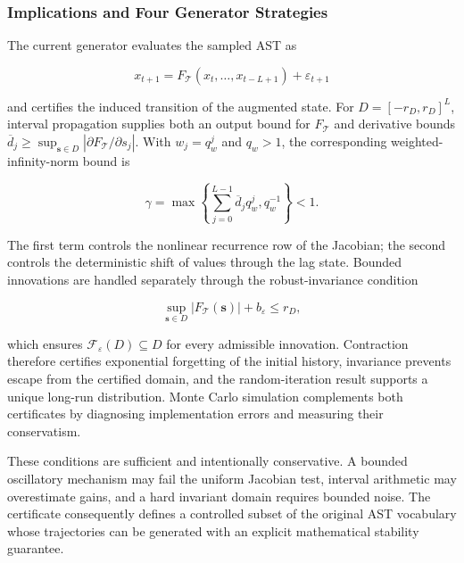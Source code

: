 \subsubsection{Implications and Four Generator Strategies}
\label{sec:four-generator-strategies}

The current generator evaluates the sampled AST as

\begin{equation}
    x_{t+1}
    =F_{\mathcal T}(x_t,\ldots,x_{t-L+1})+\varepsilon_{t+1}
\end{equation}

and certifies the induced transition of the augmented state. For
$D=[-r_D,r_D]^L$, interval propagation supplies both an output bound for
$F_{\mathcal T}$ and derivative bounds
$\overline d_j\ge
\sup_{\mathbf{s}\in D}|\partial F_{\mathcal T}/\partial s_j|$. With
$w_j=q_w^j$ and $q_w>1$, the corresponding weighted-infinity-norm bound is

\begin{equation}
    \gamma
    =\max\!\left\{
      \sum_{j=0}^{L-1}\overline d_j q_w^j,
      q_w^{-1}
    \right\}<1.
\end{equation}

The first term controls the nonlinear recurrence row of the Jacobian; the
second controls the deterministic shift of values through the lag state.
Bounded innovations are handled separately through the robust-invariance
condition

\begin{equation}
    \sup_{\mathbf{s}\in D}|F_{\mathcal T}(\mathbf{s})|
    +b_{\varepsilon}
    \le r_D,
\end{equation}

which ensures $\mathcal F_{\varepsilon}(D)\subseteq D$ for every admissible
innovation. Contraction therefore certifies exponential forgetting of the
initial history, invariance prevents escape from the certified domain, and the
random-iteration result supports a unique long-run distribution. Monte Carlo
simulation complements both certificates by diagnosing implementation errors
and measuring their conservatism.

These conditions are sufficient and intentionally conservative. A bounded
oscillatory mechanism may fail the uniform Jacobian test, interval arithmetic
may overestimate gains, and a hard invariant domain requires bounded noise.
The certificate consequently defines a controlled subset of the original AST
vocabulary whose trajectories can be generated with an explicit mathematical
stability guarantee.

